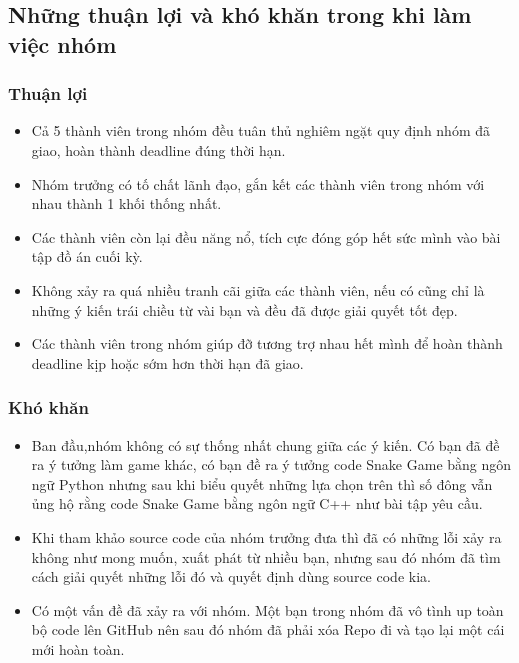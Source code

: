 \documentclass[13pt,a4paper]{article}
\begin{document}
\subsection{Những thuận lợi và khó khăn trong khi làm việc nhóm}
\subsubsection{Thuận lợi}
\begin{itemize}
    \item Cả 5 thành viên trong nhóm đều tuân thủ nghiêm ngặt quy định nhóm đã giao, hoàn thành deadline đúng thời hạn.
    \item Nhóm trưởng có tố chất lãnh đạo, gắn kết các thành viên trong nhóm với nhau thành 1 khối thống nhất.
    \item Các thành viên còn lại đều năng nổ, tích cực đóng góp hết sức mình vào bài tập đồ án cuối kỳ.
    \item Không xảy ra quá nhiều tranh cãi giữa các thành viên, nếu có cũng chỉ là những ý kiến trái chiều từ vài bạn và đều đã được giải quyết tốt đẹp.
    \item Các thành viên trong nhóm giúp đỡ tương trợ nhau hết mình để hoàn thành deadline kịp hoặc sớm hơn thời hạn đã giao.
\end{itemize}
\subsubsection{Khó khăn}
\begin{itemize}
    \item Ban đầu,nhóm không có sự thống nhất chung giữa các ý kiến. Có bạn đã đề ra ý tưởng làm game khác, có bạn đề ra ý tưởng code Snake Game bằng ngôn ngữ Python nhưng sau khi biểu quyết những lựa chọn trên thì số đông vẫn ủng hộ rằng code Snake Game bằng ngôn ngữ C++ như bài tập yêu cầu.
    \item Khi tham khảo source code của nhóm trưởng đưa thì đã có những lỗi xảy ra không như mong muốn, xuất phát từ nhiều bạn, nhưng sau đó nhóm đã tìm cách giải quyết những lỗi đó và quyết định dùng source code kia.
    \item Có một vấn đề đã xảy ra với nhóm. Một bạn trong nhóm đã vô tình up toàn bộ code lên GitHub nên sau đó nhóm đã phải xóa Repo đi và tạo lại một cái mới hoàn toàn.
\end{itemize}
\end{document}
